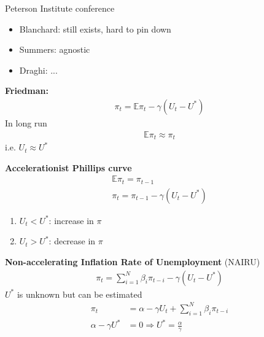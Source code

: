 \documentclass{beamer}
\begin{document}
\begin{frame}
  Peterson Institute conference
  \begin{itemize}
    \item Blanchard: still exists, hard to pin down
    \item Summers: agnostic
    \item Draghi: ...
  \end{itemize}
\end{frame}

\begin{frame}
\textbf{Friedman:}
 \begin{align}
   \pi_t = \mathbb{E}\pi_t -\gamma(U_t-U^*) 
 \end{align}
 In long run
 \begin{align}
   \mathbb{E}\pi_t \approx \pi_t
 \end{align}
 i.e. $U_t \approx U^*$
\end{frame}

\begin{frame}
  \textbf{Accelerationist Phillips curve}
  \begin{align}
    \mathbb{E}\pi_t=\pi_{t-1}\\
    \pi_t=\pi_{t-1} -\gamma(U_t-U^*)
  \end{align}
  \begin{enumerate}
    \item $U _t < U^*$: increase in $\pi$
    \item $U _t > U^*$: decrease in $\pi$
  \end{enumerate}
  
  
\end{frame}

\begin{frame}
\textbf{Non-accelerating Inflation Rate of Unemployment} (NAIRU)
  \begin{align}
    \pi_t= \sum_{i=1}^N \beta_i\pi_{t-i} -\gamma(U_t-U^*)
  \end{align}  
  $U^*$ is unknown but can be estimated
\begin{align}
  \pi_t &=\alpha - \gamma U_t +\sum_{i=1}^N \beta_i \pi_{t-i}\\
  \alpha - \gamma U^* &= 0 \Rightarrow  U^* = \frac{\alpha}{\gamma}  
\end{align}
\end{frame}
\end{document}
